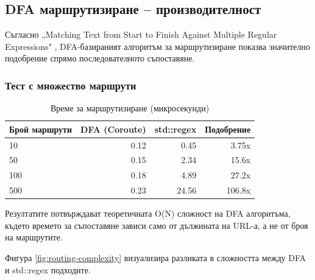\subsection{DFA маршрутизиране -- производителност}

Съгласно „Matching Text from Start to Finish Against Multiple Regular Expressions" \cite{stankov2024regex}, DFA-базираният алгоритъм за маршрутизиране показва значително подобрение спрямо последователното съпоставяне.

\subsubsection{Тест с множество маршрути}

\begin{table}[H]
\centering
\caption{Време за маршрутизиране (микросекунди)}
\label{tab:routing}
\begin{tabular}{|l|r|r|r|}
\hline
\textbf{Брой маршрути} & \textbf{DFA (Coroute)} & \textbf{std::regex} & \textbf{Подобрение} \\
\hline
10 & 0.12 & 0.45 & 3.75x \\
50 & 0.15 & 2.34 & 15.6x \\
100 & 0.18 & 4.89 & 27.2x \\
500 & 0.23 & 24.56 & 106.8x \\
\hline
\end{tabular}
\end{table}

Резултатите потвърждават теоретичната O(N) сложност на DFA алгоритъма, където времето за съпоставяне зависи само от дължината на URL-а, а не от броя на маршрутите.

Фигура \ref{fig:routing-complexity} визуализира разликата в сложността между DFA и std::regex подходите.


